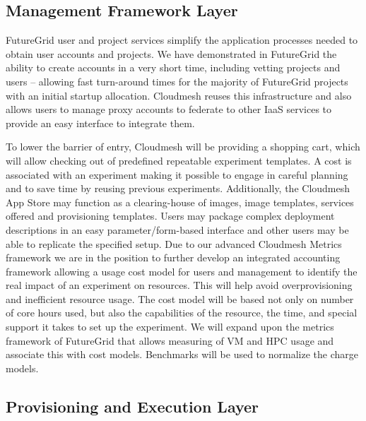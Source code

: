 \documentclass{tex/sig-alternate-2013}
\begin{document}
\subsection{Management Framework Layer}

\begin{description}[leftmargin=0pt,itemsep=0pt,topsep=0pt]

\item[User and Project Services.] FutureGrid user and project services
  simplify the application processes needed to obtain user accounts
  and projects. We have demonstrated in FutureGrid the ability to
  create accounts in a very short time, including vetting projects and
  users -- allowing fast turn-around times for the majority of
  FutureGrid projects with an initial startup allocation. Cloudmesh
  reuses this infrastructure and also allows users to manage proxy
  accounts to federate to other IaaS services to provide an easy
  interface to integrate them.

\item[Accounting and App Store.] To lower the barrier of entry,
  Cloudmesh will be providing a shopping cart, which will allow
  checking out of predefined repeatable experiment templates. A cost
  is associated with an experiment making it possible to engage in
  careful planning and to save time by reusing previous
  experiments. Additionally, the Cloudmesh App Store may function as a
  clearing-house of images, image templates, services offered and
  provisioning templates. Users may package complex deployment
  descriptions in an easy parameter/form-based interface and other
  users may be able to replicate the specified setup.  Due to our
  advanced Cloudmesh Metrics framework we are in the position to
  further develop an integrated accounting framework allowing a usage
  cost model for users and management to identify the real impact of
  an experiment on resources. This will help avoid
  overprovisioning and inefficient resource usage. The cost model will
  be based not only on number of core hours used, but also the
  capabilities of the resource, the time, and special support it takes
  to set up the experiment. We will expand upon the metrics framework
  of FutureGrid that allows measuring of VM and HPC usage and
  associate this with cost models. Benchmarks will be used to
  normalize the charge models.

\end{description}

\subsection{Provisioning and Execution Layer}
\end{document}
